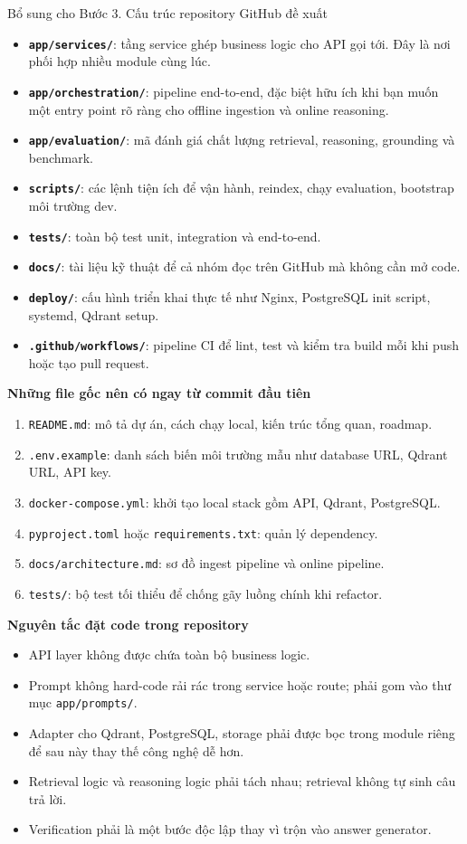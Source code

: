 \documentclass[12pt,a4paper]{article}
\begin{document}
\begin{stepbox}{Bổ sung cho Bước 3. Cấu trúc repository GitHub đề xuất}
\begin{itemize}
    \item \textbf{\texttt{app/services/}}: tầng service ghép business logic cho API gọi tới. Đây là nơi phối hợp nhiều module cùng lúc.
    \item \textbf{\texttt{app/orchestration/}}: pipeline end-to-end, đặc biệt hữu ích khi bạn muốn một entry point rõ ràng cho offline ingestion và online reasoning.
    \item \textbf{\texttt{app/evaluation/}}: mã đánh giá chất lượng retrieval, reasoning, grounding và benchmark.
    \item \textbf{\texttt{scripts/}}: các lệnh tiện ích để vận hành, reindex, chạy evaluation, bootstrap môi trường dev.
    \item \textbf{\texttt{tests/}}: toàn bộ test unit, integration và end-to-end.
    \item \textbf{\texttt{docs/}}: tài liệu kỹ thuật để cả nhóm đọc trên GitHub mà không cần mở code.
    \item \textbf{\texttt{deploy/}}: cấu hình triển khai thực tế như Nginx, PostgreSQL init script, systemd, Qdrant setup.
    \item \textbf{\texttt{.github/workflows/}}: pipeline CI để lint, test và kiểm tra build mỗi khi push hoặc tạo pull request.
\end{itemize}

\textbf{Những file gốc nên có ngay từ commit đầu tiên}
\begin{enumerate}[label=\arabic*.]
    \item \texttt{README.md}: mô tả dự án, cách chạy local, kiến trúc tổng quan, roadmap.
    \item \texttt{.env.example}: danh sách biến môi trường mẫu như database URL, Qdrant URL, API key.
    \item \texttt{docker-compose.yml}: khởi tạo local stack gồm API, Qdrant, PostgreSQL.
    \item \texttt{pyproject.toml} hoặc \texttt{requirements.txt}: quản lý dependency.
    \item \texttt{docs/architecture.md}: sơ đồ ingest pipeline và online pipeline.
    \item \texttt{tests/}: bộ test tối thiểu để chống gãy luồng chính khi refactor.
\end{enumerate}

\textbf{Nguyên tắc đặt code trong repository}
\begin{itemize}
    \item API layer không được chứa toàn bộ business logic.
    \item Prompt không hard-code rải rác trong service hoặc route; phải gom vào thư mục \texttt{app/prompts/}.
    \item Adapter cho Qdrant, PostgreSQL, storage phải được bọc trong module riêng để sau này thay thế công nghệ dễ hơn.
    \item Retrieval logic và reasoning logic phải tách nhau; retrieval không tự sinh câu trả lời.
    \item Verification phải là một bước độc lập thay vì trộn vào answer generator.
\end{itemize}


\end{stepbox}
\end{document}
